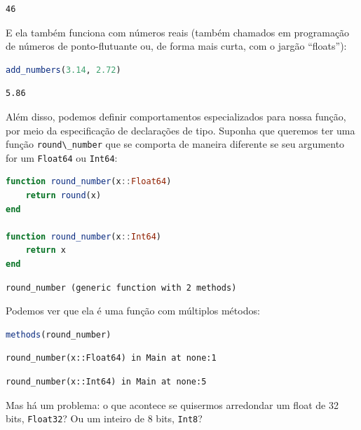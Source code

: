 \documentclass[
  notoc %
]{tufte-book}
\newcommand{\passthrough}[1]{#1}
\begin{document}
\begin{lstlisting}[language=Output]
46
\end{lstlisting}

E ela também funciona com números reais (também chamados em programação
de números de ponto-flutuante ou, de forma mais curta, com o jargão
``floats''):

\begin{lstlisting}[language=Julia]
add_numbers(3.14, 2.72)
\end{lstlisting}

\begin{lstlisting}[language=Output]
5.86
\end{lstlisting}

Além disso, podemos definir comportamentos especializados para nossa
função, por meio da especificação de declarações de tipo. Suponha que
queremos ter uma função \passthrough{\lstinline!round\_number!} que se
comporta de maneira diferente se seu argumento for um
\passthrough{\lstinline!Float64!} ou \passthrough{\lstinline!Int64!}:

\begin{lstlisting}[language=Julia]
function round_number(x::Float64)
    return round(x)
end

function round_number(x::Int64)
    return x
end
\end{lstlisting}

\begin{lstlisting}[language=Output]
round_number (generic function with 2 methods)
\end{lstlisting}

Podemos ver que ela é uma função com múltiplos métodos:

\begin{lstlisting}[language=Julia]
methods(round_number)
\end{lstlisting}

\begin{lstlisting}[language=Output]
round_number(x::Float64) in Main at none:1
\end{lstlisting}

\begin{lstlisting}[language=Output]
round_number(x::Int64) in Main at none:5
\end{lstlisting}

Mas há um problema: o que acontece se quisermos arredondar um float de
32 bits, \passthrough{\lstinline!Float32!}? Ou um inteiro de 8 bits,
\passthrough{\lstinline!Int8!}?
\end{document}
